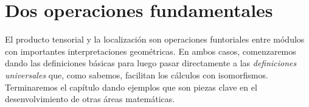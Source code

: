 \documentclass[12pt]{book}
\newtheorem{eje}{Ejemplo}
\begin{document}
%
%
%
%
%

















\chapter{Dos operaciones fundamentales}

El producto tensorial y la localización son operaciones funtoriales entre módulos con importantes interpretaciones geométricas. En ambos casos, comenzaremos dando las definiciones básicas para luego pasar directamente a las \textit{definiciones universales} que, como sabemos, facilitan los cálculos con isomorfismos. Terminaremos el capítulo dando ejemplos que son piezas clave en el desenvolvimiento de otras áreas matemáticas.  
\end{document}
